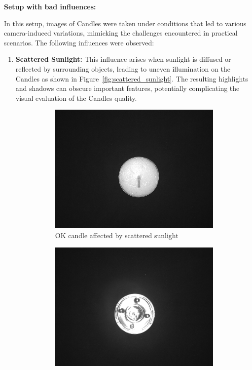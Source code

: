\documentclass[12pt,DIV14,BCOR12mm,a4paper,footinclude=false,headinclude,parskip=half-,twoside,openright,cleardoublepage=empty,toc=index,bibliography=totoc,listof=totoc]{scrreprt}
\numberwithin{equation}{chapter}
\begin{document}
\textbf{Setup with bad influences:}

In this setup, images of Candles were taken under conditions that led to various camera-induced variations, mimicking the challenges encountered in practical scenarios. The following influences were observed:

\begin{enumerate}
    \item \textbf{Scattered Sunlight:} This influence arises when sunlight is diffused or reflected by surrounding objects, leading to uneven illumination on the Candles as shown in Figure~\ref{fig:scattered_sunlight}. The resulting highlights and shadows can obscure important features, potentially complicating the visual evaluation of the Candles quality.

    \begin{figure}
        \centering
        \begin{subfigure}[b]{0.45\textwidth}
            \centering
            \includegraphics[scale=0.15]{../media/Candles-influence-sunlight-OK.png}
            \caption{OK candle affected by scattered sunlight}
        \end{subfigure}
        \hfill
        \begin{subfigure}[b]{0.45\textwidth}
            \centering
            \includegraphics[scale=0.15]{../media/Candles-influence-sunlight-NOK.png}

\end{subfigure}
\end{figure}
\end{enumerate}
\end{document}
